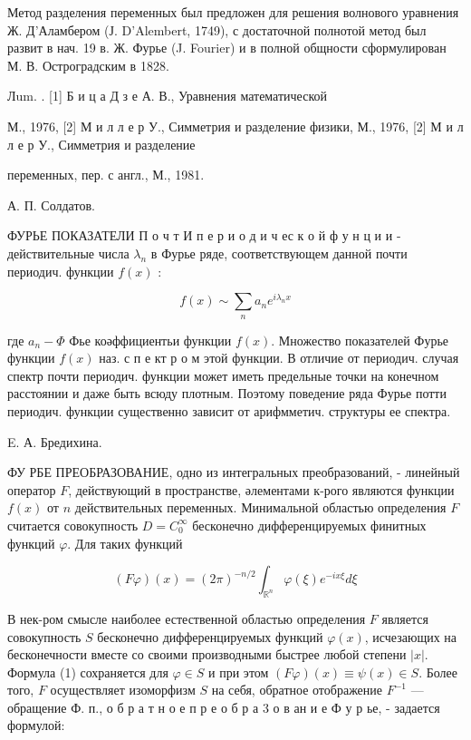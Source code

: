 \documentclass[10pt]{article}
\begin{document}
Метод разделения переменных был предложен для решения волнового уравнения Ж. Д'Аламбером (Ј. D'Alembert, 1749), с достаточной полнотой метод был развит в нач. 19 в. Ж. Фурье (J. Fourier) и в полной общности сформулирован М. В. Остроградским в 1828.



Лum. . [1] Б и ц а Д з е А. В., Уравнения математической

М., 1976, [2] М и л л е р У., Симметрия и разделение физики, М., 1976, [2] М и л л е р У., Симметрия и разделение

переменных, пер. с англ., М., 1981.

А. П. Солдатов.



ФУРЬЕ ПОКАЗАТЕЛИ П о ч т И п е р и о д и ч ес к о й ф у н ц и и - действительные числа $\lambda_{n}$ в Фурье ряде, соответствующем данной почти периодич. функции $f(x)$ :



\[

f(x) \sim \sum_{n} a_{n} e^{i \lambda_{n} x}

\]



где $a_{n}-\Phi$ Фье коәффициентьи функции $f(x)$. Множество показателей Фурье функции $f(x)$ наз. с п е кт р о м этой функции. В отличие от периодич. случая спектр почти периодич. функции может иметь предельные точки на конечном расстоянии и даже быть всюду плотным. Поэтому поведение ряда Фурье потти периодич. функции существенно зависит от арифмметич. структуры ее спектра.



E. А. Бредихина.



ФУ РБЕ ПРЕОБРАЗОВАНИЕ, одно из интегральных преобразований, - линейный оператор $F$, действующий в пространстве, әлементами к-рого являются функции $f(x)$ от $n$ действительных переменных. Минимальной областью определения $F$ считается совокупность $D=C_{0}^{\infty}$ бесконечно дифференцируемых финитных функций $\varphi$. Для таких функций



\[

(F \varphi)(x)=(2 \pi)^{-n / 2} \int_{\mathbb{R}^{n}} \varphi(\xi) e^{-i x \xi} d \xi

\]



В нек-ром смысле наиболее естественной областью определения $F$ является совокупность $S$ бесконечно дифференцируемых функций $\varphi(x)$, исчезающих на бесконечности вместе со своими производными быстрее любой степени $|x|$. Формула (1) сохраняется для $\varphi \in S$ и при этом $(F \varphi)(x) \equiv \psi(x) \in S$. Более того, $F$ осуществляет изоморфизм $S$ на себя, обратное отображение $F^{-1}$ — обращение Ф. п., о б р а т н о е п р е о б р а 3 о в ан и е Ф у р ье, - задается формулой:
\end{document}
